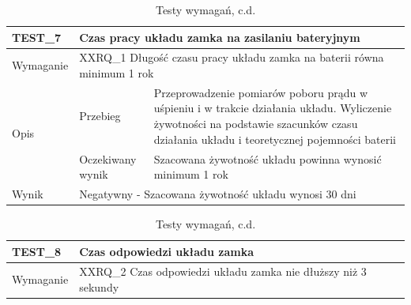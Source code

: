         \pagebreak

        \begin{table}[h!]
            \ContinuedFloat
            \caption{Testy wymagań, c.d.}
            \begin{subtable}[c]{\textwidth}
                \centering
                    \begin{tabular}{p{2cm}|p{}|p{}}
                    TEST\_7               & \multicolumn{2}{l}{\textbf{Czas pracy układu zamka na zasilaniu bateryjnym}}                                                            \\ \hline
                    Wymaganie             & \multicolumn{2}{p{12cm}}{XXRQ\_1 Długość czasu pracy układu zamka na baterii równa minimum 1 rok }                                                                                    \\ \hline
                    \multirow{2}{*}{Opis} & Przebieg           & Przeprowadzenie pomiarów poboru prądu w uśpieniu i w trakcie działania układu. Wyliczenie żywotności na podstawie szacunków czasu działania układu i teoretycznej pojemności baterii\\ \cline{2-3}
                                          & Oczekiwany wynik   & Szacowana żywotność układu powinna wynosić minimum 1 rok                                                 \\ \hline
                    Wynik                 & \multicolumn{2}{p{12cm}}{Negatywny - Szacowana żywotność układu wynosi 30 dni}                                                                                  \\
                    \end{tabular}%
                \label{tbl:test6}
                \vspace{10mm}
            \end{subtable}
        \quad%
            \begin{subtable}[c]{\textwidth}
                \centering
                    \begin{tabular}{p{2cm}|p{}|p{}}
                    TEST\_8               & \multicolumn{2}{l}{\textbf{Czas odpowiedzi układu zamka}}                                                            \\ \hline
                    Wymaganie             & \multicolumn{2}{p{12cm}}{XXRQ\_2 Czas odpowiedzi układu zamka nie dłuższy niż 3 sekundy }                                                                                    \\ \hline

\end{tabular}
\end{subtable}
\end{table}
